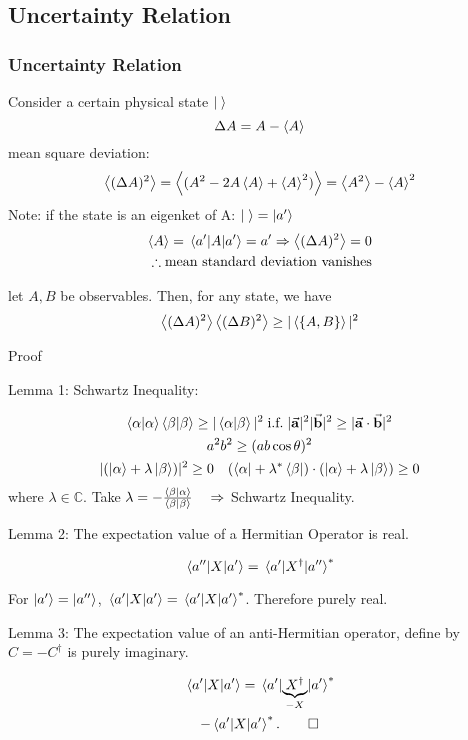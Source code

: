 \subsection{Uncertainty Relation}
\begin{frame}
	\frametitle{Uncertainty Relation}
	Consider a certain physical state $\ket{\;}$\\
	\[\Delta A = A - \ev{A}\]
	mean square deviation:
	\[
		\ev{(\Delta A)^2} = \ev{ (A^2 - 2A \ev{A} + \ev{A}^2 ) } = \ev{A^2} - \ev{A}^2
	\]
	Note: if the state is an eigenket of A: $\ket{\;} = \ket{a'}$
	\[\begin{split}
			\ev{A} = \mel{a'}{A}{a'} = a' \Rightarrow \ev{(\Delta A)^2} = 0 \\ \therefore \text{mean standard deviation vanishes}
		\end{split}
	\]
\end{frame}
\begin{frame}
	\begin{theorem}
		let $A,B$ be observables. Then, for any state, we have
		\[
			\ev{(\Delta A)^2}\ev{(\Delta B)^2} \ge |\ev{\acomm{A}{B}}|^2
		\]
	\end{theorem}
	Proof

	Lemma 1: Schwartz Inequality:

	\begin{gather*}
		\ip{\alpha} \ip{\beta} \ge |\ip{\alpha}{\beta}|^2 \; \text{i.f.} \; |\va a|^2 |\va b|^2 \ge  |\va a \cdot \va b|^2\\
		a^2 b^2 \ge (ab \cos{\theta})^2\\
		|(\ket \alpha + \lambda \ket \beta)|^2 \ge 0  \quad (\bra{\alpha} + \lambda^* \bra \beta) \cdot (\ket \alpha + \lambda \ket \beta) \ge 0
	\end{gather*}
	where $\lambda \in \mathbb{C}$. Take $\lambda = -\frac{\ip{\beta}{\alpha}}{\ip{\beta}{\beta}} \quad \Rightarrow$ Schwartz Inequality.
\end{frame}
\begin{frame}
	Lemma 2: The expectation value of a Hermitian Operator is real.

	\[
		\mel{a''}{X}{a'} = \mel{a'}{X^\dag}{a''}^*
	\]

	For $\ket{a'} = \ket{a''}$, $\mel{a'}{X}{a'} = \mel{a'}{X}{a'}^*$. Therefore purely real.

	\vfill

	Lemma 3: The expectation value of an anti-Hermitian operator, define by $C=-C^\dag$ is purely imaginary.

	\begin{gather*}
		\mel{a'}{X}{a'} = \mel{a'}{\underbrace{X^\dag}_{-X}}{a'}^*\\
		-\mel{a'}{X}{a'}^*. \qed
	\end{gather*}
\end{frame}

